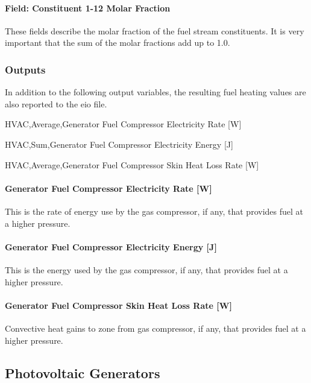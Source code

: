 \paragraph{Field: Constituent 1-12 Molar Fraction}\label{field-constituent-1-12-molar-fraction}

These fields describe the molar fraction of the fuel stream constituents. It is very important that the sum of the molar fractions add up to 1.0.

\subsubsection{Outputs}\label{outputs-10-001}

In addition to the following output variables, the resulting fuel heating values are also reported to the eio file.

HVAC,Average,Generator Fuel Compressor Electricity Rate {[}W{]}

HVAC,Sum,Generator Fuel Compressor Electricity Energy {[}J{]}

HVAC,Average,Generator Fuel Compressor Skin Heat Loss Rate {[}W{]}

\paragraph{Generator Fuel Compressor Electricity Rate {[}W{]}}\label{generator-fuel-compressor-electric-power-w-1}

This is the rate of energy use by the gas compressor, if any, that provides fuel at a higher pressure.

\paragraph{Generator Fuel Compressor Electricity Energy {[}J{]}}\label{generator-fuel-compressor-electric-energy-j-1}

This is the energy used by the gas compressor, if any, that provides fuel at a higher pressure.

\paragraph{Generator Fuel Compressor Skin Heat Loss Rate {[}W{]}}\label{generator-fuel-compressor-skin-heat-loss-rate-w-1}

Convective heat gains to zone from gas compressor, if any, that provides fuel at a higher pressure.

\subsection{Photovoltaic Generators}\label{photovoltaic-generators}

